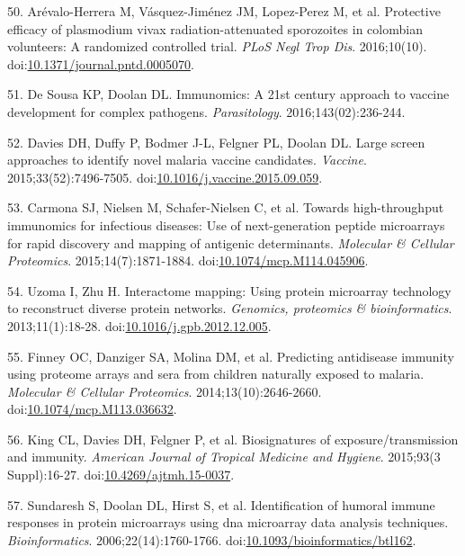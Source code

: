\documentclass[]{article}
\begin{document}
\hypertarget{ref-arevalo2016spz}{}
50. Arévalo-Herrera M, Vásquez-Jiménez JM, Lopez-Perez M, et al.
Protective efficacy of plasmodium vivax radiation-attenuated sporozoites
in colombian volunteers: A randomized controlled trial. \emph{PLoS Negl
Trop Dis}. 2016;10(10).
doi:\href{https://doi.org/10.1371/journal.pntd.0005070}{10.1371/journal.pntd.0005070}.

\hypertarget{ref-immunomics2016}{}
51. De Sousa KP, Doolan DL. Immunomics: A 21st century approach to
vaccine development for complex pathogens. \emph{Parasitology}.
2016;143(02):236-244.

\hypertarget{ref-Davies2015Large}{}
52. Davies DH, Duffy P, Bodmer J-L, Felgner PL, Doolan DL. Large screen
approaches to identify novel malaria vaccine candidates. \emph{Vaccine}.
2015;33(52):7496-7505.
doi:\href{https://doi.org/10.1016/j.vaccine.2015.09.059}{10.1016/j.vaccine.2015.09.059}.

\hypertarget{ref-carmona2015peptide}{}
53. Carmona SJ, Nielsen M, Schafer-Nielsen C, et al. Towards
high-throughput immunomics for infectious diseases: Use of
next-generation peptide microarrays for rapid discovery and mapping of
antigenic determinants. \emph{Molecular \& Cellular Proteomics}.
2015;14(7):1871-1884.
doi:\href{https://doi.org/10.1074/mcp.M114.045906}{10.1074/mcp.M114.045906}.

\hypertarget{ref-uzoma2013interactome}{}
54. Uzoma I, Zhu H. Interactome mapping: Using protein microarray
technology to reconstruct diverse protein networks. \emph{Genomics,
proteomics \& bioinformatics}. 2013;11(1):18-28.
doi:\href{https://doi.org/10.1016/j.gpb.2012.12.005}{10.1016/j.gpb.2012.12.005}.

\hypertarget{ref-Finney2014}{}
55. Finney OC, Danziger SA, Molina DM, et al. Predicting antidisease
immunity using proteome arrays and sera from children naturally exposed
to malaria. \emph{Molecular \& Cellular Proteomics}.
2014;13(10):2646-2660.
doi:\href{https://doi.org/10.1074/mcp.M113.036632}{10.1074/mcp.M113.036632}.

\hypertarget{ref-King2015FOC}{}
56. King CL, Davies DH, Felgner P, et al. Biosignatures of
exposure/transmission and immunity. \emph{American Journal of Tropical
Medicine and Hygiene}. 2015;93(3 Suppl):16-27.
doi:\href{https://doi.org/10.4269/ajtmh.15-0037}{10.4269/ajtmh.15-0037}.

\hypertarget{ref-sundaresh2006}{}
57. Sundaresh S, Doolan DL, Hirst S, et al. Identification of humoral
immune responses in protein microarrays using dna microarray data
analysis techniques. \emph{Bioinformatics}. 2006;22(14):1760-1766.
doi:\href{https://doi.org/10.1093/bioinformatics/btl162}{10.1093/bioinformatics/btl162}.
\end{document}
